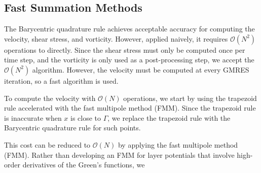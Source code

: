 \documentclass[preprint, 10pt]{elsarticle}
\begin{document}
\subsection{Fast Summation Methods}
\label{sec:fmm}
The Barycentric quadrature rule achieves acceptable accuracy for
computing the velocity, shear stress, and vorticity.  However, applied
naively, it requires $\mathcal{O}(N^2)$ operations to directly.  Since
the shear stress must only be computed once per time step, and the
vorticity is only used as a post-processing step, we accept the
$\mathcal{O}(N^2)$ algorithm.  However, the velocity must be computed at
every GMRES iteration, so a fast algorithm is used.

To compute the velocity with $\mathcal{O}(N)$ operations, we start by
using the trapezoid rule accelerated with the fast multipole method
(FMM). Since the trapezoid rule is inaccurate when $x$ is close to
$\Gamma$, we replace the trapezoid rule with the Barycentric quadrature
rule for such points.

This
cost can be reduced to $\mathcal{O}(N)$ by applying the fast multipole
method (FMM).  Rather than developing an FMM for layer potentials that
involve high-order derivatives of the Green's functions, we 
\end{document}
